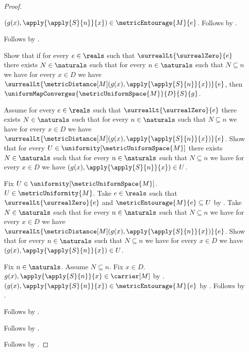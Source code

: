 \begin{proof}
\begin{subproof}
\begin{subproof}
            $(g(x),\apply{\apply{S}{n}}{x})
                \in\metricEntourage{M}{e}$.
            Follows by .
        \end{subproof}
        Follows by \auto.
    \end{subproof}
    Show that if for every $e\in\reals$ such that
        $\surrealLt{\surrealZero}{e}$ there exists $N\in\naturals$
        such that for every $n\in\naturals$ such that
            $N\subseteq n$ we have for every $x\in D$ we have
            $\surrealLt{\metricDistance[M]
                (g(x),\apply{\apply{S}{n}}{x})}{e}$, then
        $\uniformMapConverges{\metricUniformSpace{M}}{D}{S}{g}$.
    \begin{subproof}
        Assume for every $e\in\reals$ such that
            $\surrealLt{\surrealZero}{e}$ there exists $N\in\naturals$
            such that for every $n\in\naturals$ such that
                $N\subseteq n$ we have for every $x\in D$ we have
                $\surrealLt{\metricDistance[M]
                    (g(x),\apply{\apply{S}{n}}{x})}{e}$.
        Show that for every
            $U\in\uniformity[\metricUniformSpace{M}]$ there exists
            $N\in\naturals$ such that for every $n\in\naturals$
            such that $N\subseteq n$ we have for every $x\in D$ we have
            $(g(x),\apply{\apply{S}{n}}{x})\in U$.
        \begin{subproof}
            Fix $U\in\uniformity[\metricUniformSpace{M}]$.
            $U\in\metricUniformity{M}$.
            Take $e\in\reals$ such that
                $\surrealLt{\surrealZero}{e}$ and
                $\metricEntourage{M}{e}\subseteq U$
                by .
            Take $N\in\naturals$ such that for every $n\in\naturals$
                such that $N\subseteq n$ we have for every $x\in D$ we have
                $\surrealLt{\metricDistance[M]
                    (g(x),\apply{\apply{S}{n}}{x})}{e}$.
            Show that for every $n\in\naturals$ such that
                $N\subseteq n$ we have for every $x\in D$ we have
                $(g(x),\apply{\apply{S}{n}}{x})\in U$.
            \begin{subproof}
                Fix $n\in\naturals$.
                Assume $N\subseteq n$.
                Fix $x\in D$.
                $g(x),\apply{\apply{S}{n}}{x}\in\carrier[M]$
                    by .
                $(g(x),\apply{\apply{S}{n}}{x})
                    \in\metricEntourage{M}{e}$
                    by .
                Follows by .
            \end{subproof}
            Follows by \auto.
        \end{subproof}
        Follows by .
    \end{subproof}
    Follows by \auto.
\end{proof}

